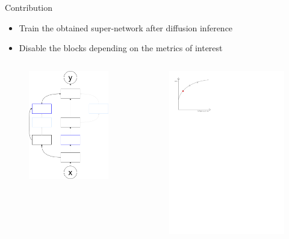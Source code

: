 \documentclass[aspectratio=169,xcolor=dvipsnames]{beamer}
\begin{document}
\begin{frame}{Contribution}
    \begin{itemize}
        \item Train the obtained super-network after diffusion inference
        \item Disable the blocks depending on the metrics of interest
    \end{itemize}
    \begin{columns}[c]
        \begin{figure}[htbp]
            \centering
            \includegraphics[width=.6\textwidth]{diagram_disabled2.drawio.png}
        \end{figure}
        \begin{figure}[htbp]
            \centering
            \includegraphics[width=.6\textwidth]{pareto_front_disabled2.pdf}
        \end{figure}
    \end{columns}
\end{frame}
\end{document}
